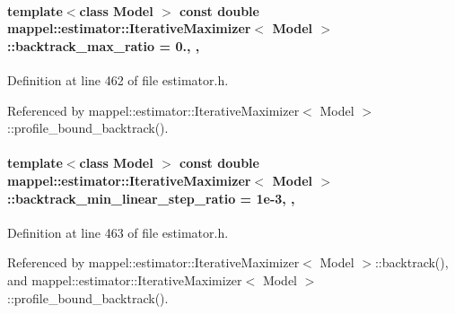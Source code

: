 \paragraph[{\texorpdfstring{backtrack\+\_\+max\+\_\+ratio}{backtrack_max_ratio}}]{\setlength{\rightskip}{0pt plus 5cm}template$<$class Model $>$ const double {\bf mappel\+::estimator\+::\+Iterative\+Maximizer}$<$ Model $>$\+::backtrack\+\_\+max\+\_\+ratio = 0.\hspace{0.3cm}{\ttfamily [static]}, {\ttfamily [protected]}, {\ttfamily [inherited]}}\hypertarget{classmappel_1_1estimator_1_1IterativeMaximizer_afa3dd68d0039939f43faf5f9508783b6}{}\label{classmappel_1_1estimator_1_1IterativeMaximizer_afa3dd68d0039939f43faf5f9508783b6}


Definition at line 462 of file estimator.\+h.



Referenced by mappel\+::estimator\+::\+Iterative\+Maximizer$<$ Model $>$\+::profile\+\_\+bound\+\_\+backtrack().

\paragraph[{\texorpdfstring{backtrack\+\_\+min\+\_\+linear\+\_\+step\+\_\+ratio}{backtrack_min_linear_step_ratio}}]{\setlength{\rightskip}{0pt plus 5cm}template$<$class Model $>$ const double {\bf mappel\+::estimator\+::\+Iterative\+Maximizer}$<$ Model $>$\+::backtrack\+\_\+min\+\_\+linear\+\_\+step\+\_\+ratio = 1e-\/3\hspace{0.3cm}{\ttfamily [static]}, {\ttfamily [protected]}, {\ttfamily [inherited]}}\hypertarget{classmappel_1_1estimator_1_1IterativeMaximizer_ac6f0771c4051b0405156bdc3e199278f}{}\label{classmappel_1_1estimator_1_1IterativeMaximizer_ac6f0771c4051b0405156bdc3e199278f}


Definition at line 463 of file estimator.\+h.



Referenced by mappel\+::estimator\+::\+Iterative\+Maximizer$<$ Model $>$\+::backtrack(), and mappel\+::estimator\+::\+Iterative\+Maximizer$<$ Model $>$\+::profile\+\_\+bound\+\_\+backtrack().

